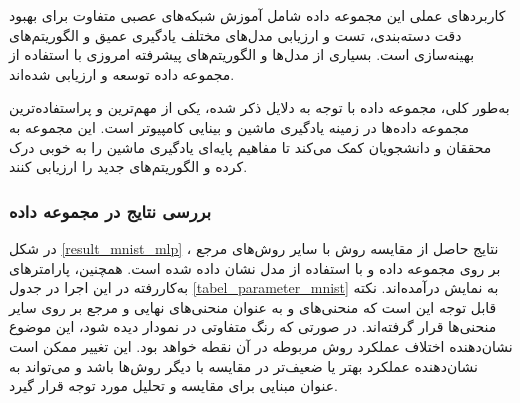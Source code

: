کاربردهای عملی این مجموعه داده شامل آموزش شبکه‌های عصبی متفاوت برای بهبود دقت دسته‌بندی، تست و ارزیابی مدل‌های مختلف یادگیری عمیق و الگوریتم‌های بهینه‌سازی است. بسیاری از مدل‌ها و الگوریتم‌های پیشرفته امروزی با استفاده از مجموعه داده
توسعه و ارزیابی شده‌اند.

به‌طور کلی، مجموعه داده
با توجه به دلایل ذکر شده، یکی از مهم‌ترین و پراستفاده‌ترین مجموعه داده‌ها در زمینه یادگیری ماشین و بینایی کامپیوتر است. این مجموعه به محققان و دانشجویان کمک می‌کند تا مفاهیم پایه‌ای یادگیری ماشین را به خوبی درک کرده و الگوریتم‌های جدید را ارزیابی کنند.


\vspace{3mm}
\subsubsection{
	بررسی نتایج در مجموعه داده
}\vspace{-1mm}

در شکل
\ref{result_mnist_mlp}%
، نتایج حاصل از مقایسه روش
با سایر روش‌های مرجع بر روی مجموعه داده
و با استفاده از مدل
نشان داده شده است. همچنین، پارامترهای به‌کاررفته در این اجرا در جدول
\ref{tabel_parameter_mnist} 
به نمایش درآمده‌اند. نکته قابل توجه این است که منحنی‌های
و
به عنوان منحنی‌های نهایی و مرجع بر روی سایر منحنی‌ها قرار گرفته‌اند. در صورتی که رنگ متفاوتی در نمودار دیده شود، این موضوع نشان‌دهنده اختلاف عملکرد روش مربوطه در آن نقطه خواهد بود. این تغییر ممکن است نشان‌دهنده عملکرد بهتر یا ضعیف‌تر در مقایسه با دیگر روش‌ها باشد و می‌تواند به عنوان مبنایی برای مقایسه و تحلیل مورد توجه قرار گیرد.


